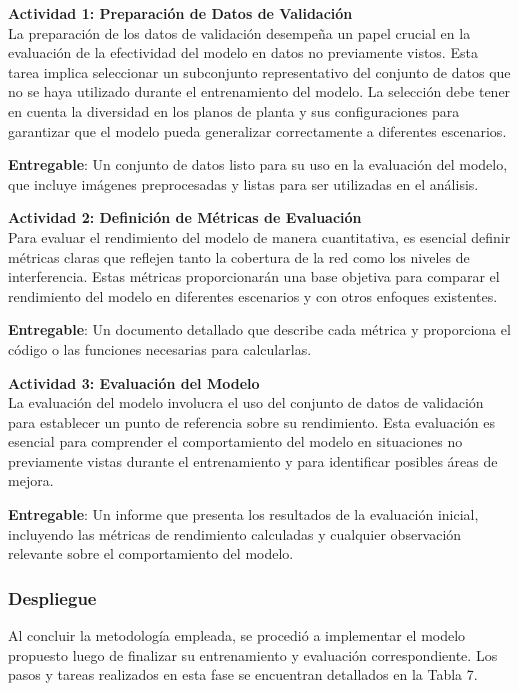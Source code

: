 \textbf{Actividad 1: Preparación de Datos de Validación}
\\
La preparación de los datos de validación desempeña un papel crucial en la evaluación de la efectividad del modelo en datos no previamente vistos. Esta tarea implica seleccionar un subconjunto representativo del conjunto de datos que no se haya utilizado durante el entrenamiento del modelo. La selección debe tener en cuenta la diversidad en los planos de planta y sus configuraciones para garantizar que el modelo pueda generalizar correctamente a diferentes escenarios.

\textbf{Entregable}: Un conjunto de datos listo para su uso en la evaluación del modelo, que incluye imágenes preprocesadas y listas para ser utilizadas en el análisis.

\textbf{Actividad 2: Definición de Métricas de Evaluación}
\\
Para evaluar el rendimiento del modelo de manera cuantitativa, es esencial definir métricas claras que reflejen tanto la cobertura de la red como los niveles de interferencia. Estas métricas proporcionarán una base objetiva para comparar el rendimiento del modelo en diferentes escenarios y con otros enfoques existentes.

\textbf{Entregable}: Un documento detallado que describe cada métrica y proporciona el código o las funciones necesarias para calcularlas.

\vspace{0.5cm}
\textbf{Actividad 3: Evaluación del Modelo}
\\
La evaluación del modelo involucra el uso del conjunto de datos de validación para establecer un punto de referencia sobre su rendimiento. Esta evaluación es esencial para comprender el comportamiento del modelo en situaciones no previamente vistas durante el entrenamiento y para identificar posibles áreas de mejora.

\textbf{Entregable}: Un informe que presenta los resultados de la evaluación inicial, incluyendo las métricas de rendimiento calculadas y cualquier observación relevante sobre el comportamiento del modelo.

\subsubsection{Despliegue}
Al concluir la metodología empleada, se procedió a implementar el modelo propuesto luego de finalizar su entrenamiento y evaluación correspondiente. Los pasos y tareas realizados en esta fase se encuentran detallados en la Tabla 7.

